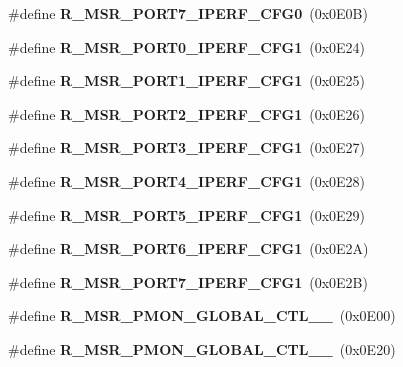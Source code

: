 \begin{DoxyCompactItemize}
\item 
\#define {\bfseries R\+\_\+\+M\+S\+R\+\_\+\+P\+O\+R\+T7\+\_\+\+I\+P\+E\+R\+F\+\_\+\+C\+F\+G0}~(0x0\+E0\+B)\label{types_8h_a05482e85080156c7a265712e73995b37}

\item 
\#define {\bfseries R\+\_\+\+M\+S\+R\+\_\+\+P\+O\+R\+T0\+\_\+\+I\+P\+E\+R\+F\+\_\+\+C\+F\+G1}~(0x0\+E24)\label{types_8h_a7c7005e95afe6bdd361e8ade30627387}

\item 
\#define {\bfseries R\+\_\+\+M\+S\+R\+\_\+\+P\+O\+R\+T1\+\_\+\+I\+P\+E\+R\+F\+\_\+\+C\+F\+G1}~(0x0\+E25)\label{types_8h_a4c47a3f8aa06e7d10f841b78fde05113}

\item 
\#define {\bfseries R\+\_\+\+M\+S\+R\+\_\+\+P\+O\+R\+T2\+\_\+\+I\+P\+E\+R\+F\+\_\+\+C\+F\+G1}~(0x0\+E26)\label{types_8h_a98c0c5acc29e6147895d11f6bb4de11e}

\item 
\#define {\bfseries R\+\_\+\+M\+S\+R\+\_\+\+P\+O\+R\+T3\+\_\+\+I\+P\+E\+R\+F\+\_\+\+C\+F\+G1}~(0x0\+E27)\label{types_8h_abebfaa2fde6310a3ce85e0e0311bb97d}

\item 
\#define {\bfseries R\+\_\+\+M\+S\+R\+\_\+\+P\+O\+R\+T4\+\_\+\+I\+P\+E\+R\+F\+\_\+\+C\+F\+G1}~(0x0\+E28)\label{types_8h_acdcb6fc1a7d8ad0aeac8d24a72a3b741}

\item 
\#define {\bfseries R\+\_\+\+M\+S\+R\+\_\+\+P\+O\+R\+T5\+\_\+\+I\+P\+E\+R\+F\+\_\+\+C\+F\+G1}~(0x0\+E29)\label{types_8h_a6e177e80a2f158692aed8377762e9f94}

\item 
\#define {\bfseries R\+\_\+\+M\+S\+R\+\_\+\+P\+O\+R\+T6\+\_\+\+I\+P\+E\+R\+F\+\_\+\+C\+F\+G1}~(0x0\+E2\+A)\label{types_8h_a4d55e2f6de902b882eab96099404942b}

\item 
\#define {\bfseries R\+\_\+\+M\+S\+R\+\_\+\+P\+O\+R\+T7\+\_\+\+I\+P\+E\+R\+F\+\_\+\+C\+F\+G1}~(0x0\+E2\+B)\label{types_8h_acdcb1863d1298052b1308036f9148120}

\item 
\#define {\bfseries R\+\_\+\+M\+S\+R\+\_\+\+P\+M\+O\+N\+\_\+\+G\+L\+O\+B\+A\+L\+\_\+\+C\+T\+L\+\_\+\_}~(0x0\+E00)\label{types_8h_ae49dab540a902aafc528ed8a3a21374b}

\item 
\#define {\bfseries R\+\_\+\+M\+S\+R\+\_\+\+P\+M\+O\+N\+\_\+\+G\+L\+O\+B\+A\+L\+\_\+\+C\+T\+L\+\_\+\_}~(0x0\+E20)\label{types_8h_a7a9abbcc666865f1760875f7d61cc798}


\end{DoxyCompactItemize}
